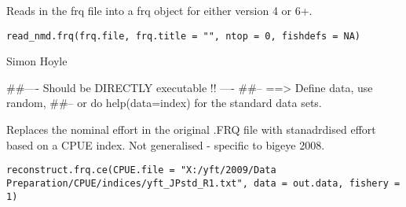 \documentclass[a4paper]{book}
\begin{document}
%
\begin{Description}\relax

Reads in the frq file into a frq object for either version 4 or 6+. 
\end{Description}
%
\begin{Usage}
\begin{verbatim}
read_nmd.frq(frq.file, frq.title = "", ntop = 0, fishdefs = NA)
\end{verbatim}
\end{Usage}
%
\begin{Arguments}
\begin{ldescription}
\item[\code{frq.file}] 


\item[\code{frq.title}] 


\item[\code{ntop}] 


\item[\code{fishdefs}] 


\end{ldescription}
\end{Arguments}
%
\begin{Author}\relax

Simon Hoyle
\end{Author}
%
\begin{Examples}
\begin{ExampleCode}
##---- Should be DIRECTLY executable !! ----
##-- ==>  Define data, use random,
##--	or do  help(data=index)  for the standard data sets.

\end{ExampleCode}
\end{Examples}
%
\begin{Description}\relax

Replaces the nominal effort in the original .FRQ file with stanadrdised effort based on a CPUE index. Not generalised - specific to bigeye 2008. 

\end{Description}
%
\begin{Usage}
\begin{verbatim}
reconstruct.frq.ce(CPUE.file = "X:/yft/2009/Data Preparation/CPUE/indices/yft_JPstd_R1.txt", data = out.data, fishery = 1)
\end{verbatim}
\end{Usage}
\end{document}

